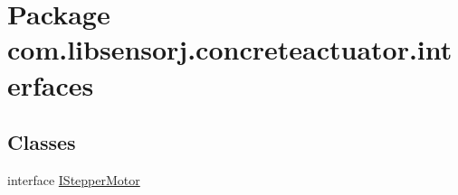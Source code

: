 \hypertarget{namespacecom_1_1libsensorj_1_1concreteactuator_1_1interfaces}{}\section{Package com.\+libsensorj.\+concreteactuator.\+interfaces}
\label{namespacecom_1_1libsensorj_1_1concreteactuator_1_1interfaces}
\subsection*{Classes}
\begin{DoxyCompactItemize}
\item 
interface \hyperlink{interfacecom_1_1libsensorj_1_1concreteactuator_1_1interfaces_1_1IStepperMotor}{I\+Stepper\+Motor}
\end{DoxyCompactItemize}
